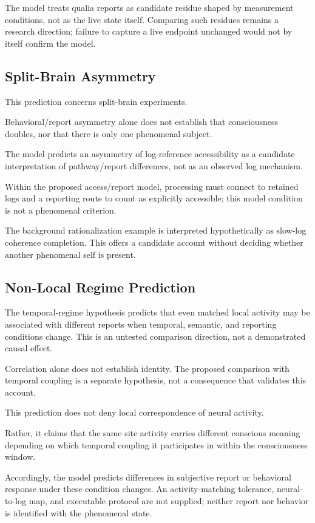 The model treats qualia reports as candidate residue shaped by measurement conditions, not as the live state itself. Comparing such residues remains a research direction; failure to capture a live endpoint unchanged would not by itself confirm the model.

\subsection{Split-Brain Asymmetry}


This prediction concerns split-brain experiments.

Behavioral/report asymmetry alone does not establish that consciousness doubles, nor that there is only one phenomenal subject.

The model predicts an asymmetry of log-reference accessibility as a candidate interpretation of pathway/report differences, not as an observed log mechanism.

Within the proposed access/report model, processing must connect to retained logs and a reporting route to count as explicitly accessible; this model condition is not a phenomenal criterion.

The background rationalization example is interpreted hypothetically as slow-log coherence completion. This offers a candidate account without deciding whether another phenomenal self is present.

\subsection{Non-Local Regime Prediction}


The temporal-regime hypothesis predicts that even matched local activity may be associated with different reports when temporal, semantic, and reporting conditions change. This is an untested comparison direction, not a demonstrated causal effect.

Correlation alone does not establish identity. The proposed comparison with temporal coupling is a separate hypothesis, not a consequence that validates this account.

This prediction does not deny local correspondence of neural activity.

Rather, it claims that the same site activity carries different conscious meaning depending on which temporal coupling it participates in within the consciousness window.

Accordingly, the model predicts differences in subjective report or behavioral response under these condition changes. An activity-matching tolerance, neural-to-log map, and executable protocol are not supplied; neither report nor behavior is identified with the phenomenal state.

